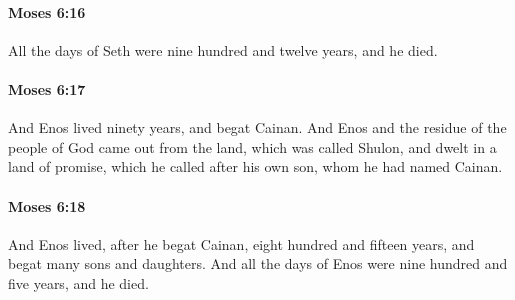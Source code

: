		\paragraph{Moses 6:16} %
			\label{MOSES-6-16}

			All the days of Seth were nine hundred and twelve years, and he died.


		\paragraph{Moses 6:17} %
			\label{MOSES-6-17}

			And Enos lived ninety years, and begat Cainan. And Enos and the residue of the people of God came out from the land, which was called Shulon, and dwelt in a land of promise, which he called after his own son, whom he had named Cainan.


		\paragraph{Moses 6:18} %
			\label{MOSES-6-18}

			And Enos lived, after he begat Cainan, eight hundred and fifteen years, and begat many sons and daughters. And all the days of Enos were nine hundred and five years, and he died.


